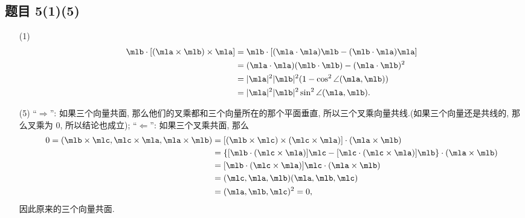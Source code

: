 \subsection*{ 题目 5(1)(5) }
\begin{solution}
\begin{enumerate}
    \item[(1)]
    \[
    \begin{aligned}
        \mlb \cdot [(\mla \times \mlb) \times \mla]  ={}& \mlb \cdot [(\mla \cdot \mla)\mlb - (\mlb \cdot \mla)\mla] \\
        ={}& (\mla \cdot \mla)(\mlb \cdot \mlb) - (\mla \cdot \mlb)^2 \\
        ={}& |\mla|^2|\mlb|^2(1 - \cos^2 \angle(\mla, \mlb)) \\
        ={}& |\mla|^2|\mlb|^2\sin^2 \angle(\mla, \mlb).
    \end{aligned}
    \]
    \item[(5)] ``$\Rightarrow$'': 如果三个向量共面, 那么他们的叉乘都和三个向量所在的那个平面垂直, 所以三个叉乘向量共线.(如果三个向量还是共线的, 那么叉乘为 0, 所以结论也成立);
    ``$\Leftarrow$'': 如果三个叉乘共面, 那么
    \[
    \begin{aligned}
        0 = (\mlb \times \mlc, \mlc \times \mla, \mla \times \mlb) ={}& 
        [(\mlb \times \mlc) \times (\mlc \times \mla)] \cdot (\mla \times \mlb) \\
        ={}& \{[\mlb \cdot (\mlc \times \mla)]\mlc - [\mlc \cdot (\mlc \times \mla)]\mlb\} \cdot (\mla \times \mlb) \\
        ={}& [\mlb \cdot (\mlc \times \mla)]\mlc \cdot (\mla \times \mlb) \\
        ={}& (\mlc, \mla, \mlb)(\mla, \mlb, \mlc) \\
        ={}& (\mla, \mlb, \mlc)^2 = 0,
    \end{aligned}
    \]
    因此原来的三个向量共面.
\end{enumerate}
\end{solution}